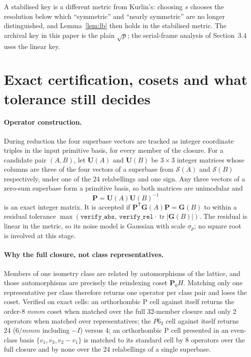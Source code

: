 \documentclass[11pt]{article}
\newcommand{\Gmet}{\mathbf{G}}
\newcommand{\Pop}{\mathbf{P}}
\newcommand{\Uop}{\mathbf{U}}
\newcommand{\Sclosure}{\mathcal{S}}
\begin{document}
A stabilised key is a different metric from Kurlin's: choosing $s$ chooses the resolution below which ``symmetric'' and ``nearly symmetric'' are no longer distinguished, and Lemma~\ref{lem:lb} then holds in the stabilised metric. The archival key in this paper is the plain $\sqrt p$; the serial-frame analysis of Section~3.4 uses the linear key.

\section{Exact certification, cosets and what tolerance still decides}
\label{app:exact}

\paragraph{Operator construction.}
During reduction the four superbase vectors are tracked as integer coordinate triples in the input primitive basis, for every member of the closure. For a candidate pair $(A,B)$, let $\Uop(A)$ and $\Uop(B)$ be $3\times3$ integer matrices whose columns are three of the four vectors of a superbase from $\Sclosure(A)$ and $\Sclosure(B)$ respectively, under one of the 24 relabellings and one sign. Any three vectors of a zero-sum superbase form a primitive basis, so both matrices are unimodular and
\[
\Pop=\Uop(A)\Uop(B)^{-1}
\]
is an exact integer matrix. It is accepted if $\Pop^{\mathsf T}\Gmet(A)\Pop=\Gmet(B)$ to within a residual tolerance $\max(\texttt{verify\_abs},\ \texttt{verify\_rel}\cdot\operatorname{tr}|\Gmet(B)|)$. The residual is linear in the metric, so its noise model is Gaussian with scale $\sigma_p$; no square root is involved at this stage.

\paragraph{Why the full closure, not class representatives.}
Members of one isometry class are related by automorphisms of the lattice, and those automorphisms are precisely the reindexing coset $\Pop_0H$. Matching only one representative per class therefore returns one operator per class pair and loses the coset. Verified on exact cells: an orthorhombic P cell against itself returns the order-8 $mmm$ coset when matched over the full 32-member closure and only 2 operators when matched over representatives; the $P6_3$ cell against itself returns 24 ($6/mmm$ including $-I$) versus 4; an orthorhombic P cell presented in an even-class basis $\{v_1,v_3,v_2-v_1\}$ is matched to its standard cell by 8 operators over the full closure and by none over the 24 relabellings of a single superbase.
\end{document}
